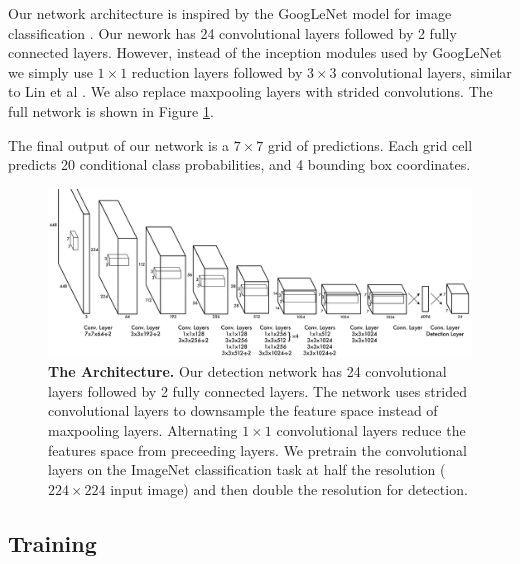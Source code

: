 \documentclass{article} %
\begin{document}
Our network architecture is inspired by the GoogLeNet model for image classification \cite{DBLP:journals/corr/SzegedyLJSRAEVR14}. Our nework has 24 convolutional layers followed by 2 fully connected layers. However, instead of the inception modules used by GoogLeNet we simply use $1 \times 1$ reduction layers followed by $3 \times 3$ convolutional layers, similar to Lin et al \cite{DBLP:journals/corr/LinCY13}. We also replace maxpooling layers with strided convolutions. The full network is shown in Figure \ref{net}.

The final output of our network is a $7 \times 7$ grid of predictions. Each grid cell predicts 20 conditional class probabilities, and 4 bounding box coordinates.

   \begin{figure}[h]
      \centering
        \includegraphics[width=\linewidth]{detectnet2}
      \caption{\textbf{The Architecture.} Our detection network has 24 convolutional layers followed by 2 fully connected layers. The network uses strided convolutional layers to downsample the feature space instead of maxpooling layers. Alternating $1 \times 1$ convolutional layers reduce the features space from preceeding layers. We pretrain the convolutional layers on the ImageNet classification task at half the resolution ($224 \times 224$ input image) and then double the resolution for detection.}
      \label{net}
   \end{figure}

\subsection{Training}
\end{document}
